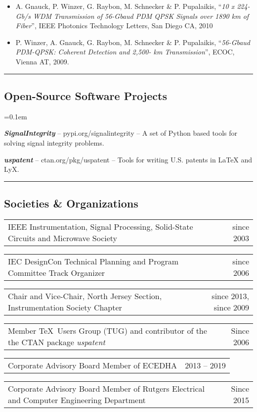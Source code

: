\documentclass[10pt,letterpaper]{extarticle}
\makeatletter
\newenvironment{indentsection}[1]%
{\begin{list}{}%
	{\setlength{\leftmargin}{#1}}%
	\item[]%
}
{\end{list}}
\newcommand{\headerrow}[2]
{\begin{tabular*}{\linewidth}{l@{\extracolsep{\fill}}r}
	#1 &
	#2 \\
\end{tabular*}}
\makeatother
\begin{document}
\begin{indentsection}{-1em}
\begin{itemize}
\item A. Gnauck, P. Winzer, G. Raybon, M. Schnecker \& P. Pupalaikis, “\emph{10 x 224-Gb/s WDM Transmission of 56-Gbaud PDM QPSK Signals over 1890 km of Fiber}”, IEEE Photonics Technology Letters, San Diego CA, 2010 
\item P. Winzer, A. Gnauck, G. Raybon, M. Schnecker \& P. Pupalaikis, “\emph{56-Gbaud PDM-QPSK: Coherent Detection and 2,500- km Transmission}”, ECOC, Vienna AT, 2009. 
\end{itemize}\end{indentsection}
\hrule
\vspace{-1em}\subsection*{\Large Open-Source Software Projects}\vspace{-0.5em}
	\parskip=0.1em
\begin{flushleft} 
\vspace{0.2em}\begin{indentsection}{-1em}\begin{itemize*}
		\item \textbf{\emph{SignalIntegrity}} -- \textsf{pypi.org/signalintegrity} -- A set of Python based tools for solving signal integrity problems.
		\item \textbf{\emph{uspatent}} -- \textsf{ctan.org/pkg/uspatent} -- Tools for writing U.S. patents in LaTeX and LyX.
\end{itemize*}\end{indentsection}\end{flushleft}
\vspace{0.2em}
\hrule
\vspace{-1em}\subsection*{\Large Societies \& Organizations}\vspace{-0.5em}
\headerrow
		{IEEE Instrumentation, Signal Processing, Solid-State Circuits and Microwave Society}
		{since 2003}
\headerrow
		{IEC DesignCon Technical Planning and Program Committee Track Organizer}
		{since 2006}
\headerrow
		{Chair and Vice-Chair, North Jersey Section, Instrumentation Society Chapter}
		{since 2013, since 2009}
\headerrow
		{Member \TeX~Users Group (TUG) and contributor of the the CTAN package \emph{uspatent}}
		{Since 2006}
\headerrow
		{Corporate Advisory Board Member of ECEDHA}
		{2013 -- 2019}
\headerrow
		{Corporate Advisory Board Member of Rutgers Electrical and Computer Engineering Department}
		{Since 2015}
\end{document}
